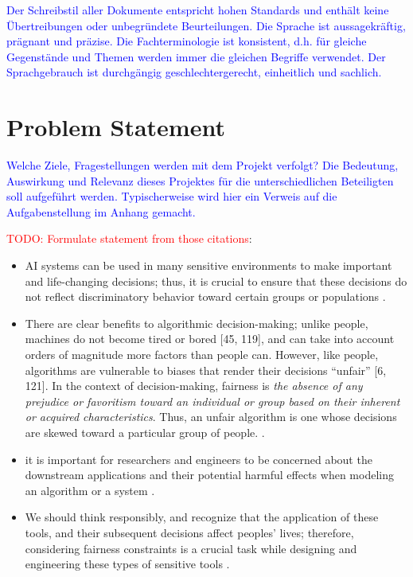 \documentclass[12pt, a4paper, oneside]{book}   	%
\renewcommand{\todo}[1]{\textcolor{red}{TODO: #1}}
\newcommand{\baaCriteria}[1]{\textcolor{blue}{#1}}
\begin{document}
	
	\baaCriteria{Der Schreibstil aller Dokumente entspricht hohen Standards und enthält keine Übertreibungen oder unbegründete Beurteilungen. Die Sprache ist aussagekräftig, prägnant und präzise. Die Fachterminologie ist konsistent, d.h. für gleiche Gegenstände und Themen werden immer die gleichen Begriffe verwendet. Der Sprachgebrauch ist durchgängig geschlechtergerecht, einheitlich und sachlich.}
	
	\listoffigures
	\listoftables
	\printnoidxglossaries
	
	
	
	\mainmatter
	
	
	\chapter{Problem Statement}
		\baaCriteria{Welche Ziele, Fragestellungen werden mit dem Projekt verfolgt? Die Bedeutung, Auswirkung und Relevanz dieses Projektes für die unterschiedlichen Beteiligten soll aufgeführt werden. Typischerweise wird hier ein Verweis auf die Aufgabenstellung im Anhang gemacht.}
	
		\todo{Formulate statement from those citations}:
		\begin{itemize}
			\item AI systems can be used in many sensitive environments to make important and life-changing decisions; thus, it is crucial to ensure that these decisions do not reflect discriminatory behavior toward certain groups or populations \autocite{Mehrabi_2021}.
			\item There are clear benefits to algorithmic decision-making; unlike people, machines do not become tired or bored [45, 119], and can take into account orders of magnitude more factors than people can. However, like people, algorithms are vulnerable to biases that render their decisions “unfair” [6, 121]. In the context of decision-making, fairness is \textit{the absence of any prejudice or favoritism toward an individual or group based on their inherent or acquired characteristics}. Thus, an unfair algorithm is one whose decisions are skewed toward a particular group of people. \autocite{Mehrabi_2021}.
			\item it is important for researchers and engineers to be concerned about the downstream applications and their potential harmful effects when modeling an algorithm or a system \autocite{Mehrabi_2021}.
			\item We should think responsibly, and recognize that the application of these tools, and their subsequent decisions affect peoples’ lives; therefore, considering fairness constraints is a crucial task while designing and engineering these types of sensitive tools \autocite{Mehrabi_2021}.
		\end{itemize}
	
\end{document}
